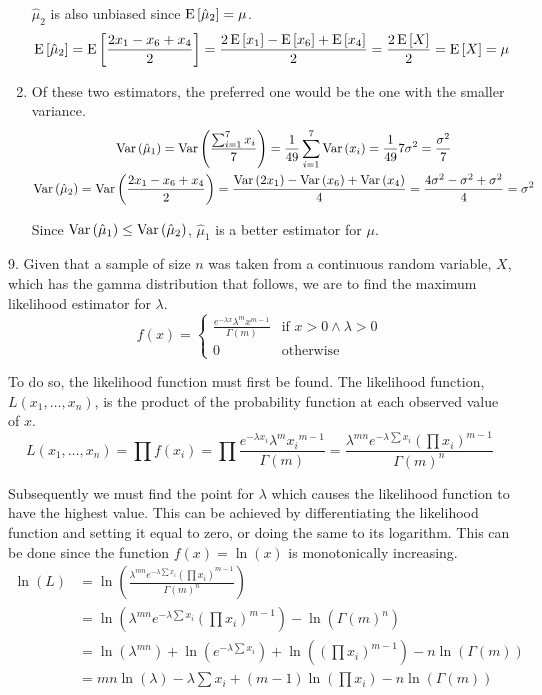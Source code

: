 \documentclass[fleqn]{article}
\begin{document}
\begin{answers}
\begin{enumerate}
				\(\hat{\mu}_2\) is also unbiased since \(\operatorname{E}\left[\hat{\mu}_2\right] = \mu\).
				\[\operatorname{E}\left[\hat{\mu}_2\right] = \operatorname{E}\left[\frac{2x_1 - x_6 + x_4}{2}\right] = \frac{2\operatorname{E}\left[x_1\right] - \operatorname{E}\left[x_6\right] + \operatorname{E}\left[x_4\right]}{2} = \frac{2\operatorname{E}\left[X\right]}{2} = \operatorname{E}\left[X\right] = \mu\]

			\item %
				Of these two estimators, the preferred one would be the one with the smaller variance.
				\begin{gather*}
					\operatorname{Var}\left(\hat{\mu}_1\right) = \operatorname{Var}\left(\frac{\sum_{i=1}^7 x_i}{7}\right) = \frac{1}{49} \sum_{i=1}^7 \operatorname{Var}\left(x_i\right) = \frac{1}{49}7\sigma^2 = \frac{\sigma^2}{7} \\
					\operatorname{Var}\left(\hat{\mu}_2\right) = \operatorname{Var}\left(\frac{2x_1 - x_6 + x_4}{2}\right) = \frac{\operatorname{Var}\left(2x_1\right) - \operatorname{Var}\left(x_6\right) + \operatorname{Var}\left(x_4\right)}{4} = \frac{4\sigma^2 - \sigma^2 + \sigma^2}{4} = \sigma^2
				\end{gather*}

				Since \(\operatorname{Var}\left(\hat{\mu}_1\right) \leq \operatorname{Var}\left(\hat{\mu}_2\right)\), \(\hat{\mu}_1\) is a better estimator for \(\mu\).
		\end{enumerate}

	\item[9.]
		Given that a sample of size \(n\) was taken from a continuous random variable, \(X\), which has the gamma distribution that follows, we are to find the maximum likelihood estimator for \(\lambda\).
		\[
			f(x) = \begin{cases}
				\displaystyle{\frac{e^{-\lambda x} \lambda^m x^{m-1}}{\Gamma(m)}} & \text{if } x > 0 \land \lambda > 0 \\
				0                                                                 & \text{otherwise}
			\end{cases}
		\]

		To do so, the likelihood function must first be found. The likelihood function, \(L(x_1, \dots, x_n)\), is the product of the probability function at each observed value of \(x\).
		\[
			L(x_1, \dots, x_n) = \prod f(x_i)
			= \prod \frac{e^{-\lambda x_i} \lambda^m {x_i}^{m-1}}{\Gamma(m)}
			= \frac{\lambda^{mn} e^{-\lambda \sum x_i} \left(\prod x_i \right)^{m-1}}{\Gamma(m)^n}
		\]

		Subsequently we must find the point for \(\lambda\) which causes the likelihood function to have the highest value. This can be achieved by differentiating the likelihood function and setting it equal to zero, or doing the same to its logarithm. This can be done since the function \(f(x) = \ln(x)\) is monotonically increasing.
		\begin{align*}
			\ln(L) & = \ln \left( \frac{\lambda^{mn} e^{-\lambda \sum x_i} \left(\prod x_i \right)^{m-1}}{\Gamma(m)^n} \right) \\
			       & = \ln \left( \lambda^{mn} e^{-\lambda \sum x_i} \left(\prod x_i \right)^{m-1}\right) - \ln(\Gamma(m)^n) \\
			       & = \ln(\lambda^{mn}) + \ln\left( e^{-\lambda \sum x_i} \right) + \ln\left( \left(\prod x_i \right)^{m-1}\right) - n \ln(\Gamma(m)) \\
			       & = mn \ln(\lambda) - \lambda \sum x_i + (m-1) \ln\left(\prod x_i \right) - n \ln(\Gamma(m))
		\end{align*}


\end{answers}
\end{document}
